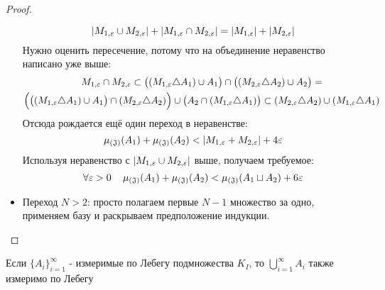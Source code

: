 \begin{proof}
\begin{itemize}
		\[
			|M_{1, \varepsilon} \cup M_{2, \varepsilon}| + |M_{1, \varepsilon} \cap M_{2, \varepsilon}| = |M_{1, \varepsilon}| + |M_{2, \varepsilon}|
		\]
		Нужно оценить пересечение, потому что на объединение неравенство написано уже выше:
		\begin{multline*}
			M_{1, \varepsilon} \cap M_{2, \varepsilon} \subset \big((M_{1, \varepsilon} \triangle A_1) \cup A_1\big) \cap \big((M_{2, \varepsilon} \triangle A_2) \cup A_2\big) =
			\\
			\Big(\big((M_{1, \varepsilon} \triangle A_1) \cup A_1\big) \cap (M_{2, \varepsilon} \triangle A_2)\Big) \cup \big(A_2 \cap (M_{1, \varepsilon} \triangle A_1)\big) \subset (M_{2, \varepsilon} \triangle A_2) \cup (M_{1, \varepsilon} \triangle A_1)
		\end{multline*}
		Отсюда рождается ещё один переход в неравенстве:
		\[
			\operatorname{\mu_{(\mathfrak{J})}}(A_1) + \operatorname{\mu_{(\mathfrak{J})}}(A_2) < |M_{1, \varepsilon} + M_{2, \varepsilon}| + 4\varepsilon
		\]
		Используя неравенство с $|M_{1, \varepsilon} \cup M_{2, \varepsilon}|$ выше, получаем требуемое:
		\[
			\forall \varepsilon > 0 \quad \operatorname{\mu_{(\mathfrak{J})}}(A_1) + \operatorname{\mu_{(\mathfrak{J})}}(A_2) < \operatorname{\mu_{(\mathfrak{J})}}(A_1 \sqcup A_2) + 6\varepsilon
		\]
		
		\item Переход $N > 2$: просто полагаем первые $N - 1$ множество за одно, применяем базу и раскрываем предположение индукции.
	\end{itemize}
\end{proof}

\begin{theorem}
	Если $\{A_i\}_{i = 1}^\infty$ - измеримые по Лебегу подмножества $K_I$, то $\bigcup_{i = 1}^\infty A_i$ также измеримо по Лебегу
\end{theorem}

